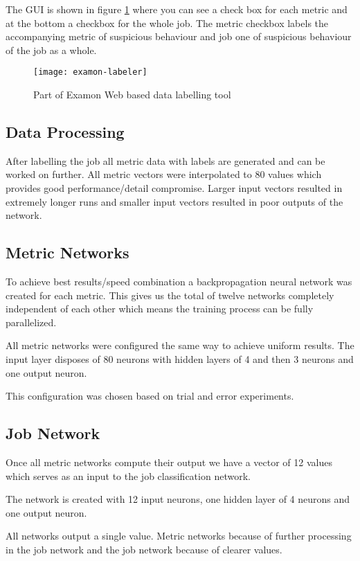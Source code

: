 The GUI is shown in figure \ref{fig:ex-labeler} where you can see a check box for each metric and at the bottom a checkbox for the whole job. The metric checkbox labels the accompanying metric of suspicious behaviour and job one of suspicious behaviour of the job as a whole.

\begin{figure}[ht]
    \centering
    \texttt{[image: examon-labeler]}
    \caption{Part of Examon Web based data labelling tool}
    \label{fig:ex-labeler}
\end{figure}

\subsection{Data Processing}

After labelling the job all metric data with labels are generated and can be worked on further. All metric vectors were interpolated to 80 values which provides good performance/detail compromise. Larger input vectors resulted in extremely longer runs and smaller input vectors resulted in poor outputs of the network.

\subsection{Metric Networks}

To achieve best results/speed combination a backpropagation neural network was created for each metric. This gives us the total of twelve networks completely independent of each other which means the training process can be fully parallelized.

All metric networks were configured the same way to achieve uniform results. The input layer disposes of 80 neurons with hidden layers of 4 and then 3 neurons and one output neuron.

This configuration was chosen based on trial and error experiments.

\subsection{Job Network}
Once all metric networks compute their output we have a vector of 12 values which serves as an input to the job classification network.

The network is created with 12 input neurons, one hidden layer of 4 neurons and one output neuron.

All networks output a single value. Metric networks because of further processing in the job network and the job network because of clearer values.
